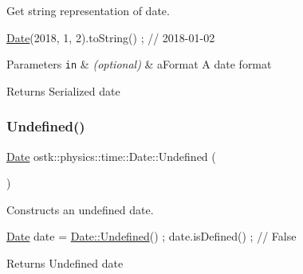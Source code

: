 Get string representation of date. 


\begin{DoxyCode}
\hyperlink{classostk_1_1physics_1_1time_1_1_date_a3ff43a5f7a8ce8350e894b51befeb50d}{Date}(2018, 1, 2).toString() ; \textcolor{comment}{// 2018-01-02}
\end{DoxyCode}



\begin{DoxyParams}[1]{Parameters}
\mbox{\tt in}  & {\em (optional)} & a\+Format A date format \\
\hline
\end{DoxyParams}
\begin{DoxyReturn}{Returns}
Serialized date 
\end{DoxyReturn}
\mbox{\label{classostk_1_1physics_1_1time_1_1_date_adbffa0c4847013c5a562acccda582f4e}} 
\subsubsection{\texorpdfstring{Undefined()}{Undefined()}}
{\footnotesize\ttfamily \hyperlink{classostk_1_1physics_1_1time_1_1_date}{Date} ostk\+::physics\+::time\+::\+Date\+::\+Undefined (\begin{DoxyParamCaption}{ }\end{DoxyParamCaption})\hspace{0.3cm}{\ttfamily [static]}}



Constructs an undefined date. 


\begin{DoxyCode}
\hyperlink{classostk_1_1physics_1_1time_1_1_date_a3ff43a5f7a8ce8350e894b51befeb50d}{Date} date = \hyperlink{classostk_1_1physics_1_1time_1_1_date_adbffa0c4847013c5a562acccda582f4e}{Date::Undefined}() ;
date.isDefined() ; \textcolor{comment}{// False}
\end{DoxyCode}


\begin{DoxyReturn}{Returns}
Undefined date 
\end{DoxyReturn}
\mbox{\label{classostk_1_1physics_1_1time_1_1_date_acc3389d494f95b539f600997d1ec7d85}} 
